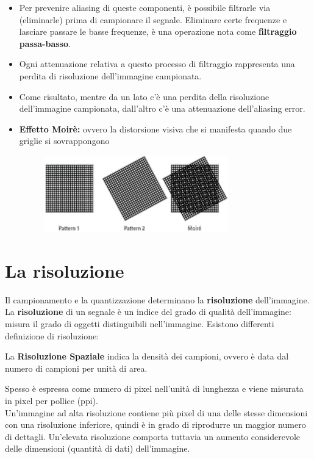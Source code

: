 \begin{itemize}
    \item Per prevenire aliasing di queste componenti, è possibile filtrarle via
          (eliminarle) prima di campionare il segnale. Eliminare certe frequenze
          e lasciare passare le basse frequenze, è una operazione nota come
          \textbf{filtraggio passa-basso}.
    \item Ogni attenuazione relativa a questo processo di filtraggio rappresenta
          una perdita di risoluzione dell'immagine campionata.
    \item Come risultato, mentre da un lato c'è una perdita della risoluzione
          dell'immagine campionata, dall'altro c'è una attenuazione
          dell'aliasing error.
    \item \textbf{Effetto Moirè:} ovvero la distorsione visiva che si manifesta
          quando due griglie si sovrappongono
          \begin{figure}[H]
              \centering
              \includegraphics[width=8cm, keepaspectratio]{capitoli/immagini/imgs/effetto_moire.jpg}
          \end{figure}
\end{itemize}

\section{La risoluzione}
Il campionamento e la quantizzazione determinano la \textbf{risoluzione}
dell'immagine. \\

La \textbf{risoluzione} di un segnale è un indice del grado
di qualità dell'immagine: misura il grado di oggetti distinguibili
nell'immagine. Esistono differenti definizione di risoluzione:

\begin{definition}
    La \textbf{Risoluzione Spaziale} indica la densità dei campioni, ovvero è data dal numero di campioni
    per unità di area.
\end{definition}

Spesso è espressa come numero di pixel
nell'unità di lunghezza e viene misurata in pixel per pollice (ppi).
\\Un'immagine ad alta risoluzione contiene più pixel di una delle
stesse dimensioni con una risoluzione inferiore, quindi è in grado di
riprodurre un maggior numero di dettagli. Un'elevata risoluzione
comporta tuttavia un aumento considerevole delle dimensioni (quantità
di dati) dell'immagine.

